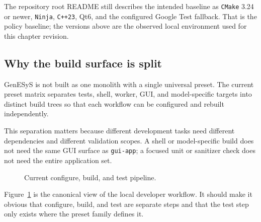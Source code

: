 The repository root README still describes the intended baseline as
\texttt{CMake} 3.24 or newer, \texttt{Ninja}, \texttt{C++23}, Qt6, and the
configured Google Test fallback. That is the policy baseline; the versions
above are the observed local environment used for this chapter revision.

\subsection{Why the build surface is split}
\label{subsec:dev-why-build-surface-split}

GenESyS is not built as one monolith with a single universal preset. The
current preset matrix separates tests, shell, worker, GUI, and
model-specific targets into distinct build trees so that each workflow can be
configured and rebuilt independently.

This separation matters because different development tasks need different
dependencies and different validation scopes. A shell or model-specific build
does not need the same GUI surface as \texttt{gui-app}; a focused unit or
sanitizer check does not need the entire application set.

\begin{figure}[htbp]
\centering
\caption{Current configure, build, and test pipeline.}
\label{fig:dev-build-pipeline}
\end{figure}

Figure~\ref{fig:dev-build-pipeline} is the canonical view of the local
developer workflow. It should make it obvious that configure, build, and test
are separate steps and that the test step only exists where the preset family
defines it.

